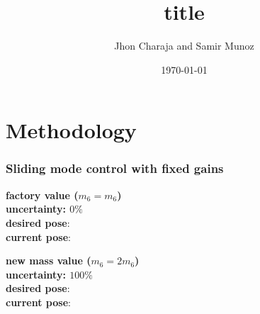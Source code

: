 

\title[Article presentation]{title}

\author[J. Charaja and S. Munoz]{Jhon Charaja and Samir Munoz}

\date{\today}



	\frame{\titlepage}
	\section{Methodology}
	
	\begin{frame}
		\frametitle{Sliding mode control with fixed gains}
		
		\begin{minipage}[t]{0.45\textwidth}
			\graphicspath{{images/methodology/SMC/exp1/circular/uncertainty_100_alpha_0/}}
			\centering
			{\large \textbf{factory value ($m_6=m_6$)}} \\
			\vspace{.2cm}
			{\color{blue} \textbf{uncertainty: $0\%$}} \\
			{\color{forestgreen} \textbf{desired pose}: \scalebox{1.5}{$\bullet$}} \\
			{\color{darkyellow}  \textbf{current pose}: \scalebox{1.5}{$\bullet$}} \\			
			
						
		\end{minipage}
		\hspace{.08\textwidth}
		\begin{minipage}[t]{0.45\textwidth}
			\graphicspath{{images/methodology/SMC/exp1/circular/uncertainty_100_alpha_0/}}
			\centering
			{\large \textbf{new mass value ($m_6=2 m_6$)}}\\
			\vspace{.2cm}
			{\color{blue} \textbf{uncertainty: $100\%$}} \\
			{\color{forestgreen} \textbf{desired pose}: \scalebox{1.5}{$\bullet$}} \\
			{\color{darkyellow}  \textbf{current pose}: \scalebox{1.5}{$\bullet$}} \\	
			

\end{minipage}
\end{frame}

